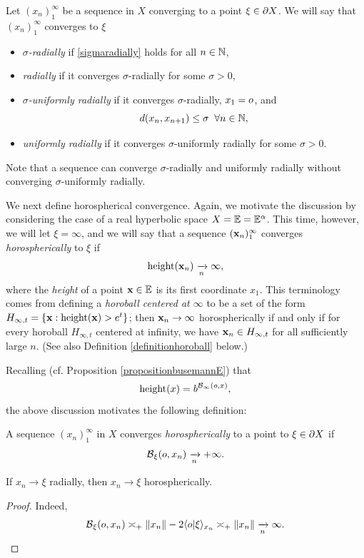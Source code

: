 \begin{definition}
\label{definitionradialconvergence}
Let $(x_n)_1^\infty$ be a sequence in $X$ converging to a point $\xi\in\partial X$. We will say that $(x_n)_1^\infty$ converges to $\xi$
\begin{itemize}
\item \emph{$\sigma$-radially} if \eqref{sigmaradially} holds for all $n\in\N$,
\item \emph{radially} if it converges $\sigma$-radially for some $\sigma > 0$,
\item \emph{$\sigma$-uniformly radially} if it converges $\sigma$-radially, $x_1 = o$, and
\[
\dist(x_n,x_{n + 1})\leq \sigma \all n\in\N,
\]
\item \emph{uniformly radially} if it converges $\sigma$-uniformly radially for some $\sigma > 0$.
\end{itemize}
\end{definition}
Note that a sequence can converge $\sigma$-radially and uniformly radially without converging $\sigma$-uniformly radially.

We next define horospherical convergence. Again, we motivate the discussion by considering the case of a real hyperbolic space $X = \E = \E^\alpha$. This time, however, we will let $\xi = \infty$, and we will say that a sequence $(\mathbf x_n)_1^\infty$ converges \emph{horospherically} to $\xi$ if
\[
\operatorname{height}(\mathbf x_n) \xrightarrow[n]{} \infty,
\]
where the \emph{height} of a point $\xx\in\E$ is its first coordinate $x_1$. This terminology comes from defining a \emph{horoball centered at $\infty$} to be a set of the form $H_{\infty,t} = \{\mathbf x : \operatorname{height}(\mathbf x) > e^t\}$; then $\mathbf x_n\to\infty$ horospherically if and only if for every horoball $H_{\infty,t}$ centered at infinity, we have $\mathbf x_n\in H_{\infty,t}$ for all sufficiently large $n$. (See also Definition \ref{definitionhoroball} below.)

Recalling (cf. Proposition \ref{propositionbusemannE}) that
\[
\operatorname{height}(x) = b^{\operatorname{\mathcal B}_\infty(o,x)},
\]
the above discussion motivates the following definition:
\begin{definition}
\label{definitionhorosphericalconvergence}
A sequence $(x_n)_1^\infty$ in $X$ converges \emph{horospherically} to a point to $\xi\in\partial X$ if
\[
\operatorname{\mathcal B}_\xi(o,x_n)\xrightarrow[n]{} +\infty.
\]
\end{definition}

\begin{observation}
If $x_n\to\xi$ radially, then $x_n\to\xi$ horospherically.
\end{observation}
\begin{proof}
Indeed,
\[
\operatorname{\mathcal B}_\xi(o,x_n) \asymp_+ \|x_n\| - 2\langle o|\xi\rangle_{x_n} \asymp_+ \|x_n\| \xrightarrow[n]{} \infty.
\]
\end{proof}

